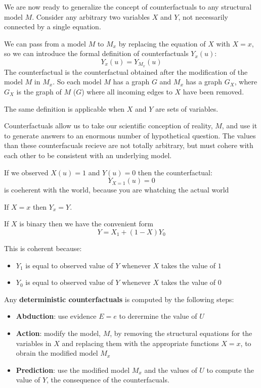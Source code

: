 We are now ready to generalize the concept of counterfactuals to any structural 
model $M$. Consider any arbitrary two variables $X$ and $Y$, not necessarily connected 
by a single equation. 

We can pass from a model $M$ to $M_x$ by replacing the equation of $X$ with $X=x$,
so we can introduce the formal definition of counterfactuals $Y_x (u)$: 
$$Y_x (u) = Y_{M_x}(u)$$
The counterfactual is the counterfactual obtained after the modification of the model 
$M$ in $M_x$. So each model $M$ has a graph $G$ and $M_x$ has a graph $G_X$, where 
$G_X$ is the graph of $M$ ($G$) where all incoming edges to $X$ have been removed. 

The same definition is applicable when $X$ and $Y$ are sets of variables. 

Counterfactuals allow us to take our scientific conception of reality, $M$, and 
use it to generate answers to an enormous number of hypothetical question. 
The values than these counterfacuals recieve are not totally arbitrary, but must 
cohere with each other to be consistent with an underlying model.

\begin{note}
    If we observed $X(u)=1$ and $Y(u) = 0$ then the counterfactual:
    $$Y_{X=1}(u)=0$$
    is coeherent with the world, because you are whatching the actual world
\end{note}

\begin{definition}   
If $X= x$ then $Y_x=Y$. 

If $X$ is binary then we have the convenient form 
$$Y = X_1 + (1-X)Y_0 $$
\end{definition}
This is coherent because:
\begin{itemize}
    \item $Y_1$ is equal to observed value of $Y$ whenever $X$ takes the value of $1$
    \item $Y_0$ is equal to observed value of $Y$ whenever $X$ takes the value of $0$
\end{itemize}

Any \textbf{deterministic counterfactuals} is computed by the following steps:
\begin{itemize}
    \item \textbf{Abduction}: use evidence $E = e$ to derermine the value of $U$
    \item \textbf{Action}: modify the model, $M$, by removing the structural equations for 
    the variables in $X$ and replacing them with the appropriate functions $X = x$, 
    to obrain the modified model $M_x$
    \item \textbf{Prediction}: use the modified model $M_x$ and the values of $U$ to compute 
    the value of $Y$, the consequence of the counterfacuals. 
\end{itemize}

